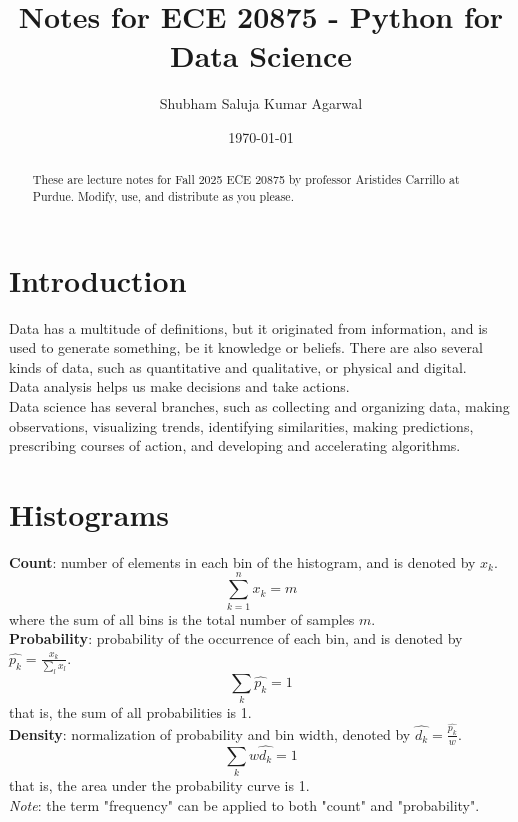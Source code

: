 \documentclass[nobib]{tufte-handout}
\title{Notes for ECE 20875 - Python for Data Science}
\author[Shubham Saluja Kumar Agarwal]{Shubham Saluja Kumar Agarwal}
\date{\today}  %
\begin{document}
\maketitle

\begin{abstract}
    These are lecture notes for Fall 2025 ECE 20875 by professor Aristides Carrillo at Purdue. Modify, use, and distribute as you please.
\end{abstract}

\tableofcontents

\newpage

\section{Introduction}
Data has a multitude of definitions, but it originated from information, and is
used to generate something, be it knowledge or beliefs. There are also several
kinds of data, such as quantitative and qualitative, or physical and digital.\\
Data analysis helps us make decisions and take actions.\\ Data science has
several branches, such as collecting and organizing data, making observations,
visualizing trends, identifying similarities, making predictions, prescribing
courses of action, and developing and accelerating algorithms.\\

\section{Histograms}
\textbf{Count}: number of elements in each bin of the histogram, and is denoted by $x_k$.
\begin{equation*}
    \sum_{k=1}^{n}x_k = m
\end{equation*}
where the sum of all bins is the total number of samples $m$.\\
\textbf{Probability}: probability of the occurrence of each bin, and is denoted by $\hat{p_k} = \frac{x_k}{\sum_{l}x_l}$.
\begin{equation*}
    \sum_{k}\hat{p_k} = 1
\end{equation*}
that is, the sum of all probabilities is 1.\\
\textbf{Density}: normalization of probability and bin width, denoted by $\hat{d_k} = \frac{\hat{p_k}}{w}$.
\begin{equation*}
    \sum_{k}w\hat{d_k} = 1
\end{equation*}
that is, the area under the probability curve is 1.\\
\textit{Note}: the term "frequency" can be applied to both "count" and "probability".
\end{document}
